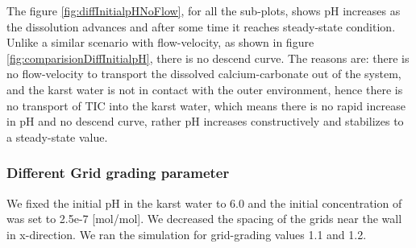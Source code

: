 The figure \ref{fig:diffInitialpHNoFlow}, for all the sub-plots, shows pH increases as the dissolution advances and after some time 
it reaches steady-state condition. Unlike a similar scenario with flow-velocity, as shown in figure \ref{fig:comparisionDiffInitialpH}, there is no 
descend curve. The reasons are: there is no flow-velocity to transport the dissolved calcium-carbonate out of the system, and the karst 
water is not in contact with the outer environment, hence there is no transport of TIC into the karst water, which means there is no rapid 
increase in pH and no descend curve, rather pH increases constructively and stabilizes to a steady-state value.


\subsubsection*{Different Grid grading parameter} \label{ssec:diffGridnoflow}
We fixed the initial pH in the karst water to 6.0 and the initial concentration of   was set to 2.5e-7 [mol/mol]. We decreased the 
spacing of the grids near the wall in x-direction. We ran the simulation for grid-grading values 1.1 and 1.2. 


